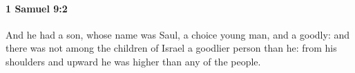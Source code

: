 
		\paragraph{1 Samuel 9:2} %
			\label{1SAMUEL-9-2}

			And he had a son, whose name was Saul, a choice young man, and a goodly: and there was not among the children of Israel a goodlier person than he: from his shoulders and upward he was higher than any of the people.


